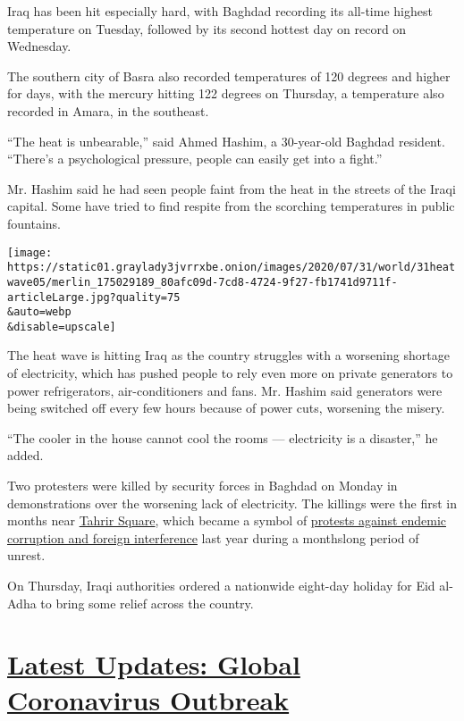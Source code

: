 Iraq has been hit especially hard, with Baghdad recording its all-time
highest temperature on Tuesday, followed by its second hottest day on
record on Wednesday.

The southern city of Basra also recorded temperatures of 120 degrees and
higher for days, with the mercury hitting 122 degrees on Thursday, a
temperature also recorded in Amara, in the southeast.

``The heat is unbearable,'' said Ahmed Hashim, a 30-year-old Baghdad
resident. ``There's a psychological pressure, people can easily get into
a fight.''

Mr. Hashim said he had seen people faint from the heat in the streets of
the Iraqi capital. Some have tried to find respite from the scorching
temperatures in public fountains.

\texttt{[image: https://static01.graylady3jvrrxbe.onion/images/2020/07/31/world/31heatwave05/merlin\_175029189\_80afc09d-7cd8-4724-9f27-fb1741d9711f-articleLarge.jpg?quality=75\\\&auto=webp\\\&disable=upscale]}

The heat wave is hitting Iraq as the country struggles with a worsening
shortage of electricity, which has pushed people to rely even more on
private generators to power refrigerators, air-conditioners and fans.
Mr. Hashim said generators were being switched off every few hours
because of power cuts, worsening the misery.

``The cooler in the house cannot cool the rooms --- electricity is a
disaster,'' he added.

Two protesters were killed by security forces in Baghdad on Monday in
demonstrations over the worsening lack of electricity. The killings were
the first in months near
\href{https://www.nytimes3xbfgragh.onion/2019/11/20/world/middleeast/iraq-protests-sadr-city.html}{Tahrir
Square}, which became a symbol of
\href{https://www.nytimes3xbfgragh.onion/2019/12/21/world/middleeast/Iraq-protests-Iran.html}{protests
against endemic corruption and foreign interference} last year during a
monthslong period of unrest.

On Thursday, Iraqi authorities ordered a nationwide eight-day holiday
for Eid al-Adha to bring some relief across the country.

\hypertarget{latest-updates-global-coronavirus-outbreak}{%
\section{\texorpdfstring{\href{https://www.nytimes3xbfgragh.onion/2020/08/01/world/coronavirus-covid-19.html?action=click\&pgtype=Article\&state=default\&region=MAIN_CONTENT_1\&context=storylines_live_updates}{Latest
Updates: Global Coronavirus
Outbreak}}{Latest Updates: Global Coronavirus Outbreak}}\label{latest-updates-global-coronavirus-outbreak}}

